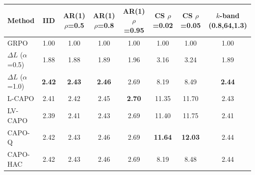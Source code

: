 \begin{tabular}{lccccccc}
\toprule
Method & IID & AR(1) $\rho$=0.5 & AR(1) $\rho$=0.8 & AR(1) $\rho$=0.95 & CS $\rho$=0.02 & CS $\rho$=0.05 & $k$-band (0.8,64,1.3) \\
\midrule
GRPO & 1.00 & 1.00 & 1.00 & 1.00 & 1.00 & 1.00 & 1.00 \\
$\Delta L$ ($\alpha$=0.5) & 1.88 & 1.88 & 1.89 & 1.96 & 3.16 & 3.24 & 1.89 \\
$\Delta L$ ($\alpha$=1.0) & \textbf{2.42} & \textbf{2.43} & \textbf{2.46} & 2.69 & 8.19 & 8.49 & \textbf{2.44} \\
L-CAPO & 2.41 & 2.42 & 2.45 & \textbf{2.70} & 11.35 & 11.70 & 2.43 \\
LV-CAPO & 2.39 & 2.41 & 2.43 & 2.69 & 11.40 & 11.75 & 2.41 \\
CAPO-Q & 2.42 & 2.43 & 2.46 & 2.69 & \textbf{11.64} & \textbf{12.03} & 2.44 \\
CAPO-HAC & 2.42 & 2.43 & 2.46 & 2.69 & 8.19 & 8.48 & 2.44 \\
\bottomrule
\end{tabular}
